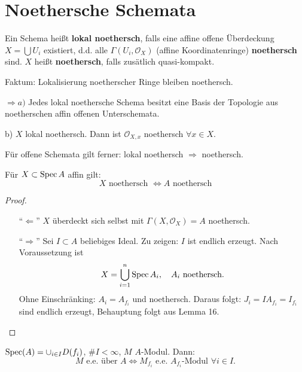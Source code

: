 \section{Noethersche Schemata }
\begin{defn}[14]
  Ein Schema heißt \textbf{lokal noethersch}, falls eine affine offene
  Überdeckung $X=\bigcup U_{i}$ existiert, d.d. alle $\Gamma(U_{i},\mathcal{O}_{X})$
  (affine Koordinatenringe) \textbf{noethersch} sind. $X$ heißt \textbf{noethersch},
  falls zusätlich quasi-kompakt.
\end{defn}

Faktum: Lokalisierung noetherscher Ringe bleiben noethersch.

$\Rightarrow a)$ Jedes lokal noethersche Schema besitzt eine Basis
der Topologie aus noetherschen affin offenen Unterschemata.

b) $X$ lokal noethersch. Dann ist $\mathcal{O}_{X,x}$ noethersch
$\forall x\in X$.

Für offene Schemata gilt ferner: lokal noethersch $\Rightarrow$ noethersch.

\begin{prop}[15]
  Für $X\subset\operatorname{Spec} A$ affin gilt:
  \[
    X\text{ noethersch }\Leftrightarrow A\text{ noethersch}
  \]
\end{prop}

\begin{proof}
  \mbox{}
  \begin{itemize}
  \item[``$\Leftarrow$''] $X$ überdeckt sich selbst mit $\Gamma(X,\mathcal{O}_{X})=A$ noethersch.
  \item[``$\Rightarrow$''] Sei $I\subset A$ beliebiges Ideal. Zu zeigen: $I$ ist endlich erzeugt.
    Nach Voraussetzung ist
    \[
      X=\bigcup_{i=1}^{n}\operatorname{Spec} A_{i},\quad A_{i}\text{ noethersch}.
    \]
    Ohne Einschränking: $A_{i}=A_{f_{i}}$ und noethersch. Daraus folgt:
    $J_{i}=IA_{f_{i}}=I_{f_{i}}$ sind endlich erzeugt, Behauptung folgt
    aus Lemma 16.
  \end{itemize}
\end{proof}
\begin{lem}[16]
  $\operatorname{Spec}(A)=\cup_{i\in I}D(f_{i})$, $\#I<\infty$, $M$ $A$-Modul.
  Dann:
  \[
    M\text{ e.e. über }A\Leftrightarrow M_{f_{i}}\text{ e.e. }A_{f_{i}}\text{-Modul }\forall i\in I.
  \]
\end{lem}

